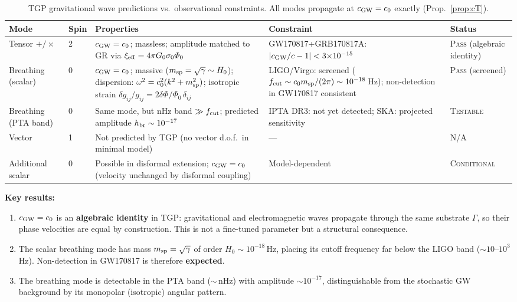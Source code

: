 
\begin{table}[htbp]
\centering
\caption{TGP gravitational wave predictions vs.\ observational constraints.
  All modes propagate at $c_{\rm GW} = c_0$ exactly (Prop.~\ref{prop:cT}).}
\label{tab:gw-summary}
\small
\begin{tabular}{@{}lllll@{}}
\toprule
\textbf{Mode} & \textbf{Spin} & \textbf{Properties} & \textbf{Constraint} & \textbf{Status} \\
\midrule
%
Tensor $+/\times$
  & 2
  & $c_{\rm GW} = c_0$; massless; amplitude matched to GR via
    $\xi_{\rm eff} = 4\pi G_0 \sigma_0 \Phi_0$
  & GW170817+GRB170817A: $|c_{\rm GW}/c - 1| < 3{\times}10^{-15}$
  & \textsc{Pass} (algebraic identity) \\[6pt]
%
Breathing (scalar)
  & 0
  & $c_{\rm GW} = c_0$; massive ($m_{\rm sp} = \sqrt{\gamma} \sim H_0$);
    dispersion: $\omega^2 = c_0^2(k^2 + m_{\rm sp}^2)$;
    isotropic strain $\delta g_{ij}/g_{ij} = 2\delta\Phi/\Phi_0\,\delta_{ij}$
  & LIGO/Virgo: screened ($f_{\rm cut} \sim c_0 m_{\rm sp}/(2\pi) \sim 10^{-18}$\,Hz);
    non-detection in GW170817 consistent
  & \textsc{Pass} (screened) \\[6pt]
%
Breathing (PTA band)
  & 0
  & Same mode, but nHz band $\gg f_{\rm cut}$;
    predicted amplitude $h_{\rm br} \sim 10^{-17}$
  & IPTA DR3: not yet detected; SKA: projected sensitivity
  & \textsc{Testable} \\[6pt]
%
Vector
  & 1
  & Not predicted by TGP (no vector d.o.f.\ in minimal model)
  & ---
  & N/A \\[6pt]
%
Additional scalar
  & 0
  & Possible in disformal extension; $c_{\rm GW} = c_0$
    (velocity unchanged by disformal coupling)
  & Model-dependent
  & \textsc{Conditional} \\
\bottomrule
\end{tabular}

\medskip
\noindent\textbf{Key results:}
\begin{enumerate}[nosep]
  \item $c_{\rm GW} = c_0$ is an \textbf{algebraic identity} in TGP:
        gravitational and electromagnetic waves propagate through the same
        substrate $\Gamma$, so their phase velocities are equal by construction.
        This is not a fine-tuned parameter but a structural consequence.
  \item The scalar breathing mode has mass $m_{\rm sp} = \sqrt{\gamma}$
        of order $H_0 \sim 10^{-18}$\,Hz, placing its cutoff frequency
        far below the LIGO band ($\sim 10$--$10^3$\,Hz).
        Non-detection in GW170817 is therefore \textbf{expected}.
  \item The breathing mode is detectable in the PTA band ($\sim$\,nHz)
        with amplitude $\sim 10^{-17}$, distinguishable from
        the stochastic GW background by its monopolar (isotropic)
        angular pattern.
\end{enumerate}
\end{table}
